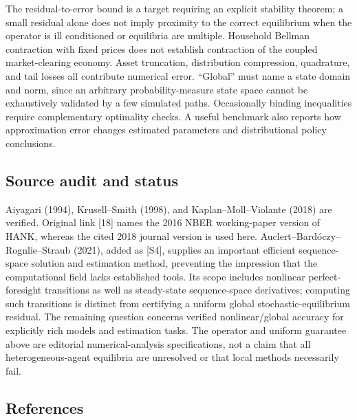 \documentclass[11pt,a4paper]{article}
\begin{document}
The residual-to-error bound is a target requiring an explicit stability theorem; a small residual alone does not imply proximity to the correct equilibrium when the operator is ill conditioned or equilibria are multiple. Household Bellman contraction with fixed prices does not establish contraction of the coupled market-clearing economy. Asset truncation, distribution compression, quadrature, and tail losses all contribute numerical error. ``Global'' must name a state domain and norm, since an arbitrary probability-measure state space cannot be exhaustively validated by a few simulated paths. Occasionally binding inequalities require complementary optimality checks. A useful benchmark also reports how approximation error changes estimated parameters and distributional policy conclusions.

\subsection*{Source audit and status}

Aiyagari (1994), Krusell--Smith (1998), and Kaplan--Moll--Violante (2018) are verified. Original link [18] names the 2016 NBER working-paper version of HANK, whereas the cited 2018 journal version is used here. Auclert--Bardóczy--Rognlie--Straub (2021), added as [S4], supplies an important efficient sequence-space solution and estimation method, preventing the impression that the computational field lacks established tools. Its scope includes nonlinear perfect-foresight transitions as well as steady-state sequence-space derivatives; computing such transitions is distinct from certifying a uniform global stochastic-equilibrium residual. The remaining question concerns verified nonlinear/global accuracy for explicitly rich models and estimation tasks. The operator and uniform guarantee above are editorial numerical-analysis specifications, not a claim that all heterogeneous-agent equilibria are unresolved or that local methods necessarily fail.

\subsection*{References}
\end{document}
